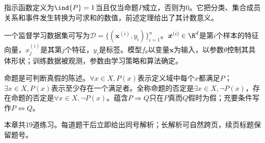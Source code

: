 指示函数定义为$\ind\{P\}=1$当且仅当命题$P$成立，否则为$0$。它把分类、集合成员关系和事件发生转换为可求和的数值，前述定理给出了其计数意义。


一个监督学习数据集可写为$\mathcal D=\{(\boldsymbol{x}^{(i)},y_i)\}_{i=1}^{n}$。$\boldsymbol{x}^{(i)}\in\R^d$是第$i$个样本的特征向量，$x^{(i)}_j$是其第$j$个特征，$y_i$是标签。模型$f_{\theta}$以变量$\boldsymbol{x}$为输入，以参数$\theta$控制其具体形状；训练数据被观测，参数由学习策略和算法确定。


命题是可判断真假的陈述。$\forall x\in X,P(x)$表示定义域中每个$x$都满足$P$；$\exists x\in X,P(x)$表示至少存在一个满足者。全称命题的否定是$\exists x\in X,\neg P(x)$，存在命题的否定是$\forall x\in X,\neg P(x)$。蕴含$P\Rightarrow Q$只在$P$真而$Q$假时为假；充要条件写作$P\Leftrightarrow Q$。


\begin{chapterexercisebox}
\label{schema:V1-C01:CH-34}
\label{schema:V1-C01:CH-35}
本章共19道练习。每道题干后立即给出同号解析；长解析可自然跨页，续页标题保留题号。
\end{chapterexercisebox}

